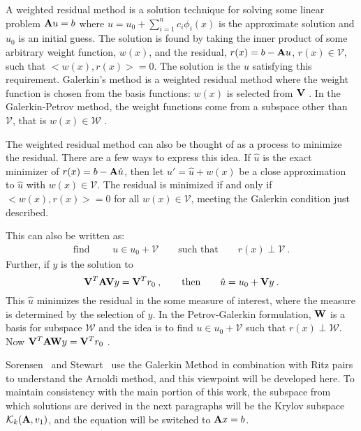 A weighted residual method is a solution technique for solving some linear problem $\mathbf{A}u = b$ where $u = u_0 + \sum_{i=1}^{n} c_i \phi_i(x)$ is the approximate solution and $u_{0}$ is an initial guess. The solution is found by taking the inner product of some arbitrary weight function, $w(x)$, and the residual, $r(x) = b - \mathbf{A}u$, $r(x) \in \mathcal{V}$, such that $<w(x), r(x)> = 0$. The solution is the $u$ satisfying this requirement. Galerkin's method is a weighted residual method where the weight function is chosen from the basis functions: $w(x)$ is selected from $\mathbf{V}$ \cite{Matthews2005}. In the Galerkin-Petrov method, the weight functions come from a subspace other than $\mathcal{V}$, that is $w(x) \in \mathcal{W}$ \cite{Skeel2006}. 

The weighted residual method can also be thought of as a process to minimize the residual. There are a few ways to express this idea. If $\hat{u}$ is the exact minimizer of $r(x) = b - \mathbf{A}\hat{u}$, then let $u' = \hat{u} + w(x)$ be a close approximation to $\hat{u}$ with $w(x) \in \mathcal{V}$. The residual is minimized if and only if $<w(x), r(x)> = 0$ for all $w(x) \in \mathcal{V}$, meeting the Galerkin condition just described. 

This can also be written as: 
%
\begin{align}
  \text{find } \qquad u \in u_{0} + \mathcal{V} \qquad \text{such that} \qquad r(x) \perp \mathcal{V} \:.
  \label{eq:galerkinMin}
\end{align}
%
Further, if $y$ is the solution to
\begin{equation}
  \mathbf{V}^{T}\mathbf{AV}y = \mathbf{V}^{T} r_{0} \:, \qquad \text{then} \qquad \hat{u} = u_{0} + \mathbf{V}y \:.
  \label{eq:minResidual}
\end{equation}
This $\hat{u}$ minimizes the residual in the some measure of interest, where the measure is determined by the selection of $y$. In the Petrov-Galerkin formulation, $\mathbf{W}$ is a basis for subspace $\mathcal{W}$ and the idea is to find $ u \in u_{0} + \mathcal{V}$ such that $r(x) \perp \mathcal{W}$. Now $\mathbf{V}^T\mathbf{AW}y = \mathbf{V}^T r_0$ \cite{Skeel2006}.

Sorensen~\cite{Sorensen1996} and Stewart~\cite{Stewart 2001} use the Galerkin Method in combination with Ritz pairs to understand the Arnoldi method, and this viewpoint will be developed here. To maintain consistency with the main portion of this work, the subspace from which solutions are derived in the next paragraphs will be the Krylov subspace $\mathcal{K}_{k}(\mathbf{A},v_{1})$, and the equation will be switched to $\mathbf{A}x = b$.


